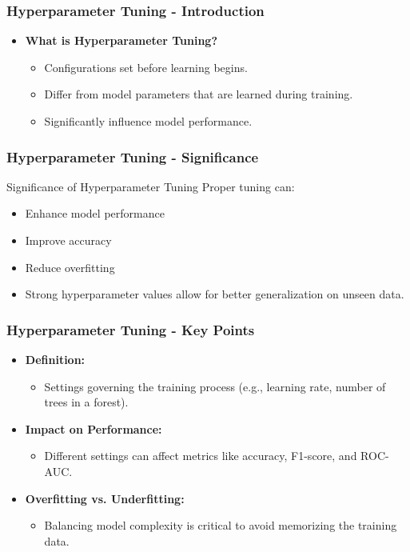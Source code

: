 \documentclass[aspectratio=169]{beamer}
\begin{document}
\begin{frame}[fragile]
    \frametitle{Hyperparameter Tuning - Introduction}
    \begin{itemize}
        \item \textbf{What is Hyperparameter Tuning?}
        \begin{itemize}
            \item Configurations set before learning begins.
            \item Differ from model parameters that are learned during training.
            \item Significantly influence model performance.
        \end{itemize}
    \end{itemize}
\end{frame}

\begin{frame}[fragile]
    \frametitle{Hyperparameter Tuning - Significance}
    \begin{block}{Significance of Hyperparameter Tuning}
        Proper tuning can:
        \begin{itemize}
            \item Enhance model performance
            \item Improve accuracy
            \item Reduce overfitting
        \end{itemize}
    \end{block}
    \begin{itemize}
        \item Strong hyperparameter values allow for better generalization on unseen data.
    \end{itemize}
\end{frame}

\begin{frame}[fragile]
    \frametitle{Hyperparameter Tuning - Key Points}
    \begin{itemize}
        \item \textbf{Definition:} 
        \begin{itemize}
            \item Settings governing the training process (e.g., learning rate, number of trees in a forest).
        \end{itemize}
        \item \textbf{Impact on Performance:}
        \begin{itemize}
            \item Different settings can affect metrics like accuracy, F1-score, and ROC-AUC.
        \end{itemize}
        \item \textbf{Overfitting vs. Underfitting:}
        \begin{itemize}
            \item Balancing model complexity is critical to avoid memorizing the training data.
        \end{itemize}
    \end{itemize}
\end{frame}
\end{document}
